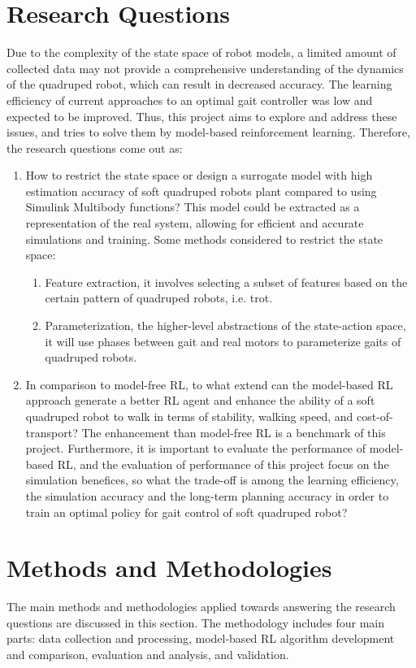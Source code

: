 \section{Research Questions} 
Due to the complexity of the state space of robot models, a limited amount of collected data may not provide a comprehensive understanding of the dynamics of the quadruped robot, which can result in decreased accuracy. The learning efficiency of current approaches to an optimal gait controller was low and expected to be improved. Thus, this project aims to explore and address these issues, and tries to solve them by model-based reinforcement learning. Therefore, the research questions come out as: 
\begin{enumerate}
    \item How to restrict the state space or design a surrogate model with high estimation accuracy of soft quadruped robots plant compared to using Simulink Multibody functions? This model could be extracted as a representation of the real system, allowing for efficient and accurate simulations and training. Some methods considered to restrict the state space:
    \begin{enumerate}
        \item Feature extraction, it involves selecting a subset of features based on the certain pattern of quadruped robots, i.e. trot.
        \item Parameterization, the higher-level abstractions of the state-action space, it will use phases between gait and real motors to parameterize gaits of quadruped robots.
    \end{enumerate}
    \item In comparison to model-free \ac{RL}, to what extend can the model-based \ac{RL} approach generate a better \ac{RL} agent and enhance the ability of a soft quadruped robot to walk in terms of stability, walking speed, and cost-of-transport? The enhancement than model-free \ac{RL} is a benchmark of this project. Furthermore, it is important to evaluate the performance of model-based \ac{RL}, and the evaluation of performance of this project focus on the simulation benefices, so what the trade-off is among the learning efficiency, the simulation accuracy and the long-term planning accuracy in order to train an optimal policy for gait control of soft quadruped robot?
\end{enumerate}

\section{Methods and Methodologies}
The main methods and methodologies applied towards answering the research questions are discussed in this section. The methodology includes four main parts: data collection and processing, model-based \ac{RL} algorithm development and comparison, evaluation and analysis, and validation.

